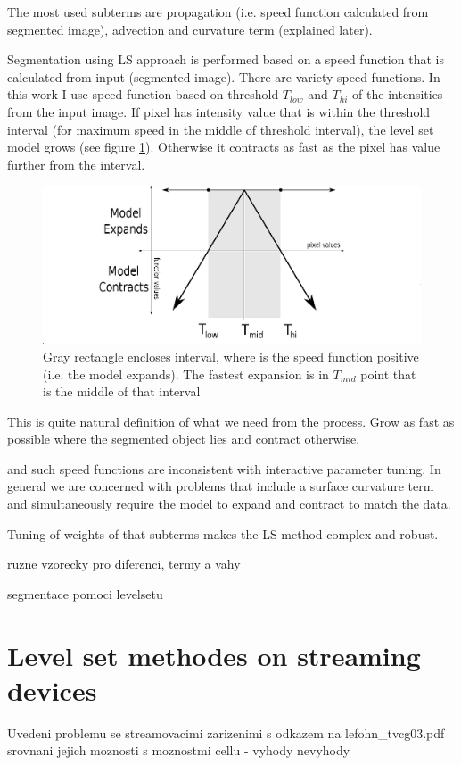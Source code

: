 The most used subterms are propagation (i.e. speed function calculated from segmented image), advection and curvature term (explained later).

Segmentation using LS approach is performed based on a speed function that is calculated from input (segmented image). There are variety speed functions. In this work I use speed function based on threshold $T_{low}$ and $T_{hi}$ of the intensities from the input image. If pixel has intensity value that is within the threshold interval (for maximum speed in the middle of threshold interval), the level set model grows (see figure \ref{fg:speedFunction}). Otherwise it contracts as fast as the pixel has value further from the interval.

\begin{figure}
    \centering
    \includegraphics[width=14cm]{data/speedFunction.eps}
    \caption[Graph of thresholding based speed function]{Gray rectangle encloses interval, where is the speed function positive (i.e. the model expands). The fastest expansion is in $T_{mid}$ point that is the middle of that interval}
    \label{fg:speedFunction}
\end{figure}

This is quite natural definition of what we need from the process. Grow as fast as possible where the segmented object lies and contract otherwise.

and such speed functions are
inconsistent with interactive parameter tuning. In general we are concerned with problems
that include a surface curvature term and simultaneously require the model to expand and
contract to match the data.

Tuning of weights of that subterms makes the LS method complex and robust. 

ruzne vzorecky pro diferenci, termy a vahy

segmentace pomoci levelsetu

\section{Level set methodes on streaming devices}

Uvedeni problemu se streamovacimi zarizenimi s odkazem na lefohn_tvcg03.pdf
srovnani jejich moznosti s moznostmi cellu - vyhody nevyhody